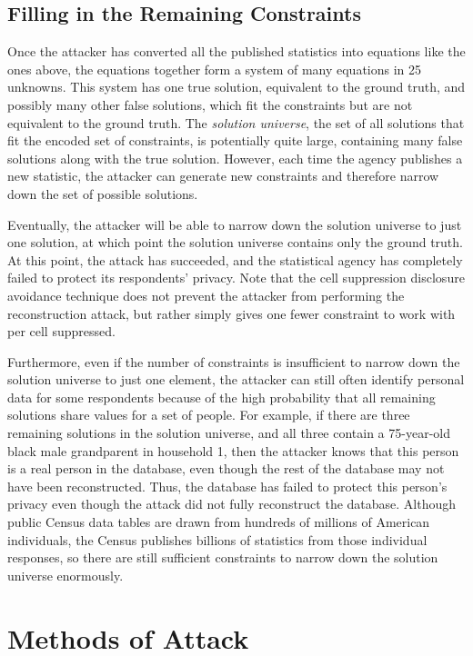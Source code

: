 \documentclass[5p,times,11pt]{elsarticle}
\begin{document}
\subsection{Filling in the Remaining Constraints}
Once the attacker has converted all the published statistics
into equations like the ones above, the equations together form a system of many equations in 25 unknowns. This system has one true solution, equivalent to the
ground truth, and possibly many other false solutions, which fit the constraints but are not equivalent to the ground truth.
The \textit{solution universe}, the set of all solutions that fit the encoded set of constraints, is potentially quite large, containing many false solutions along with the true solution.
However, each time the agency publishes a new statistic, the attacker can generate new constraints and therefore narrow
down the set of possible solutions.

Eventually, the attacker
will be able to narrow down the solution universe to just one solution, at which point the solution universe contains only
the ground truth. At this point, the attack has succeeded, and the statistical agency has completely failed to protect its respondents' privacy. Note that the cell suppression disclosure avoidance technique does not prevent the attacker from performing the reconstruction attack, but rather simply gives one fewer constraint to work with per cell suppressed.

Furthermore, even if the number of constraints is insufficient to narrow down the solution universe to just one element, the attacker can still often identify personal data for some respondents because of the high probability that all remaining solutions share values for a set of people. For example, if there are three remaining solutions in the solution universe, and all three contain a 75-year-old black male grandparent in household 1, then the attacker knows that this person is a real person in the database, even though the rest of the database may not have been reconstructed. Thus, the database has failed to protect this person's privacy even though the attack did not fully reconstruct the database.
Although public Census data tables are drawn from hundreds of millions of American individuals, the Census publishes billions of statistics from those individual responses, so there are still sufficient constraints to narrow down the solution universe enormously.


\section{Methods of Attack}
\end{document}
